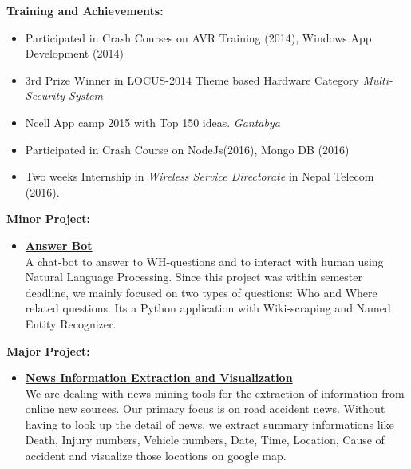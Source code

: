 \documentclass[hidelinks,a4paper, 12pt]{article}
\begin{document}
\vspace{8mm}
{\Large \textbf{ Training and Achievements: }\\ }
\vspace{-5mm}
\begin{itemize}
	\item  Participated in Crash Courses on AVR Training (2014), Windows 
	App Development (2014)
	\item 3rd Prize Winner in LOCUS-2014 Theme based Hardware Category 
	\emph{Multi-Security System}
	\item Ncell App camp 2015 with Top 150 ideas. \emph{Gantabya}
	\item Participated in Crash Course on NodeJs(2016), Mongo DB (2016) 
    \item Two weeks Internship in \emph{Wireless Service Directorate} in Nepal Telecom (2016).
\end{itemize}

\vspace{5mm}

{\Large \textbf{Minor Project: }\\}
\vspace{-5mm}
\begin{itemize}
    \item \href{https://github.com/kritishpahi/AnswerBot} {\textbf{ Answer Bot}}\\
    \small A chat-bot to answer to WH-questions and to interact with human
        using Natural Language Processing. Since this project was within semester deadline, we mainly focused on two types of questions: Who and Where related questions. Its a Python application with Wiki-scraping and Named Entity Recognizer.
\end{itemize}

{\Large \textbf{Major Project:  }\\ }
\vspace{-5mm}
\begin{itemize}
    \item \href{ https://github.com/kritishpahi/news-ie}{\textbf{News Information Extraction and Visualization}}\\
        \small We are dealing with news mining tools for the 
        extraction of information from online new sources. 
        Our primary focus is on road accident news. 
        Without having to look up the detail of news,
        we extract summary informations like Death, Injury
        numbers, Vehicle numbers, Date, Time, Location, Cause of accident
        and visualize those locations on google map.

\end{itemize}
\end{document}
